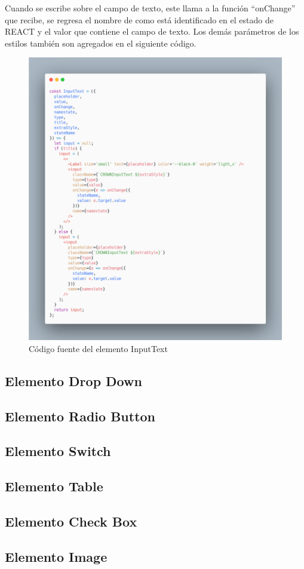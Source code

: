 Cuando se escribe sobre el campo de texto, este llama a la función “onChange” que recibe, se regresa el nombre de como está identificado en el estado de REACT y el valor que contiene el campo de texto.
Los demás parámetros de los estilos también son agregados en el siguiente código.
\newline
\newline
\begin{figure}[H]
    \includegraphics[width=1\textwidth]{./Imagenes/carbon-12.png}
    \caption[Código fuente del elemento InputText]{Código fuente del elemento InputText}
    \end{figure}
\newline
\newline



\subsection{Elemento Drop Down}
\subsection{Elemento Radio Button}
\subsection{Elemento Switch}
\subsection{Elemento Table}
\subsection{Elemento Check Box}
\subsection{Elemento Image}

